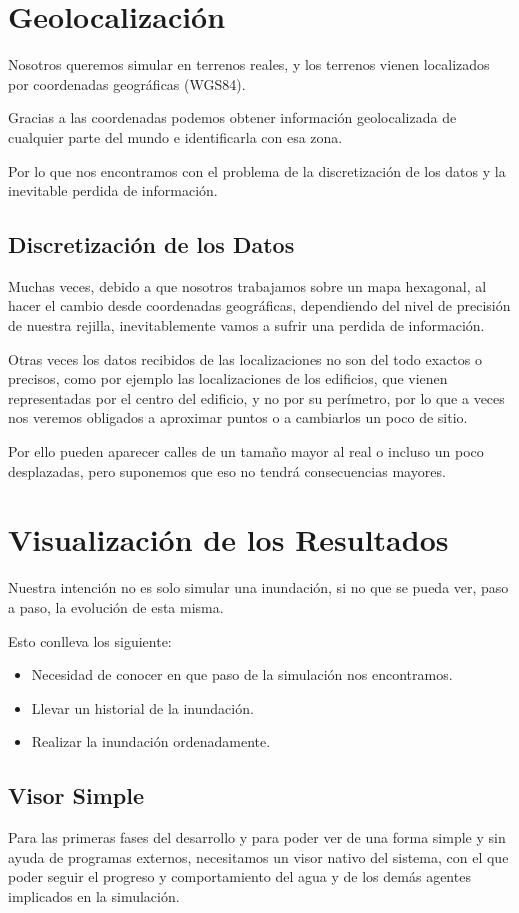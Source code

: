 \section*{Geolocalización}

Nosotros queremos simular en terrenos reales, y los terrenos vienen
localizados por coordenadas geográficas (WGS84).

Gracias a las coordenadas podemos obtener información geolocalizada de
cualquier parte del mundo e identificarla con esa zona.

Por lo que nos encontramos con el problema de la discretización de los
datos y la inevitable perdida de información.

\subsection*{Discretización de los Datos}
Muchas veces, debido a que nosotros trabajamos sobre un mapa hexagonal, al
hacer el cambio desde coordenadas geográficas, dependiendo del nivel de
precisión de nuestra rejilla, inevitablemente vamos a sufrir una perdida de
información.

Otras veces los datos recibidos de las localizaciones no son del todo exactos o
precisos, como por ejemplo las localizaciones de los edificios, que vienen
representadas por el centro del edificio, y no por su perímetro, por lo que a
veces nos veremos obligados a aproximar puntos o a cambiarlos un poco de sitio.

Por ello pueden aparecer calles de un tamaño mayor al real o incluso un poco
desplazadas, pero suponemos que eso no tendrá consecuencias mayores.

\section*{Visualización de los Resultados}

Nuestra intención no es solo simular una inundación, si no que se pueda ver,
paso a paso, la evolución de esta misma. 

Esto conlleva los siguiente:
\begin {itemize}
\item Necesidad de conocer en que paso de la simulación nos encontramos.
\item Llevar un historial de la inundación.
\item Realizar la inundación ordenadamente.
\end {itemize}

\subsection*{Visor Simple}
Para las primeras fases del desarrollo y para poder ver de una forma simple y
sin ayuda de programas externos, necesitamos un visor nativo del sistema, con
el que poder seguir el progreso y comportamiento del agua y de los demás
agentes implicados en la simulación.
